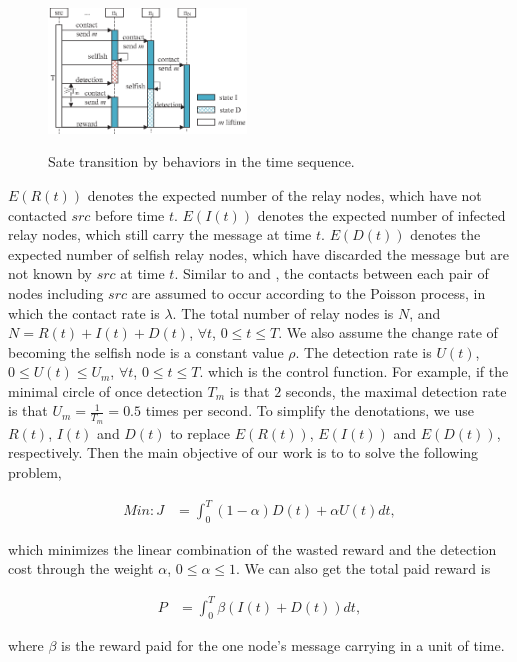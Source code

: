 \begin{figure}
  \centering
  {\includegraphics[width=0.47\textwidth]{fig/schedule.eps}}
     \caption{Sate transition by behaviors in the time sequence.}
     \label{fig:schedule}
\end{figure}
$E(R(t))$ denotes the expected number of the relay nodes,
which have not contacted $src$ before time $t$.
$E(I(t))$ denotes the expected number of infected relay nodes,
which still carry the message at time $t$.
$E(D(t))$ denotes the expected number of selfish relay nodes,
which have discarded the message but are not known by $src$
at time $t$.
Similar to \cite{DBLP:journals/tcss/WuDH18} and \cite{CC2007PerfAnaly},
the contacts between each pair of nodes including $src$
are assumed to occur according to the Poisson process,
in which the contact rate is $\lambda$.
The total number of relay nodes is $N$,
and $N=R(t)+I(t)+D(t)$, $\forall t$, $0 \le t \le T$.
We also assume the change rate of
becoming the selfish node is a constant value $\rho$.
The detection rate is $U(t)$,
$0 \le U(t) \le U_{m}$, $\forall t$, $0 \le t \le T$.
which is the control function.
For example, if the minimal circle of once detection $T_{m}$ is that $2$ seconds,
the maximal detection rate is that $U_{m} = \frac{1}{T_{m}} = 0.5$ times per second.
To simplify the denotations,
we use $R(t)$, $I(t)$ and $D(t)$ to
replace $E(R(t))$, $E(I(t))$ and $E(D(t))$,
respectively.
Then the main objective of our work is to
to solve the following problem,
\begin{small}
\begin{equation}
\label{eq:obj}
\begin{aligned}
Min: J &= \int_{0}^{T} (1-\alpha) D(t) + \alpha U(t) dt ,
\end{aligned}
\end{equation}
\end{small}
which minimizes the linear combination of
the wasted reward and the detection cost through the weight $\alpha$, $0 \le \alpha \le 1$.
We can also get the total paid reward is
\begin{small}
\begin{equation}
\label{eq:reward}
\begin{aligned}
P &= \int_{0}^{T} \beta ( I(t) + D(t) )dt,
\end{aligned}
\end{equation}
\end{small}
where $\beta$ is the reward paid for the one node's message carrying in a unit of time.
